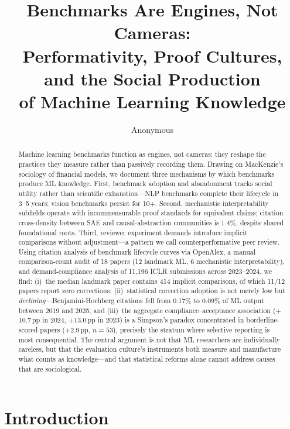 \documentclass{article}
\title{Benchmarks Are Engines, Not Cameras:\\Performativity, Proof Cultures, and the Social Production\\of Machine Learning Knowledge}
\author{Anonymous}
\begin{document}
\maketitle

\begin{abstract}
Machine learning benchmarks function as engines, not cameras: they reshape the practices they measure rather than passively recording them. Drawing on MacKenzie's sociology of financial models, we document three mechanisms by which benchmarks produce ML knowledge. First, benchmark adoption and abandonment tracks social utility rather than scientific exhaustion---NLP benchmarks complete their lifecycle in 3--5 years; vision benchmarks persist for 10+. Second, mechanistic interpretability subfields operate with incommensurable proof standards for equivalent claims; citation cross-density between SAE and causal-abstraction communities is 1.4\%, despite shared foundational roots. Third, reviewer experiment demands introduce implicit comparisons without adjustment---a pattern we call counterperformative peer review. Using citation analysis of benchmark lifecycle curves via OpenAlex, a manual comparison-count audit of 18 papers (12 landmark ML, 6 mechanistic interpretability), and demand-compliance analysis of 11,196 ICLR submissions across 2023--2024, we find: (i)~the median landmark paper contains 414 implicit comparisons, of which 11/12 papers report zero corrections; (ii)~statistical correction adoption is not merely low but \emph{declining}---Benjamini-Hochberg citations fell from 0.17\% to 0.09\% of ML output between 2019 and 2025; and (iii)~the aggregate compliance--acceptance association ($+$10.7\,pp in 2024, $+$13.0\,pp in 2023) is a Simpson's paradox concentrated in borderline-scored papers ($+$2.9\,pp, $n=53$), precisely the stratum where selective reporting is most consequential. The central argument is not that ML researchers are individually careless, but that the evaluation culture's instruments both measure and manufacture what counts as knowledge---and that statistical reforms alone cannot address causes that are sociological.
\end{abstract}

\section{Introduction}
\label{sec:intro}
\end{document}

